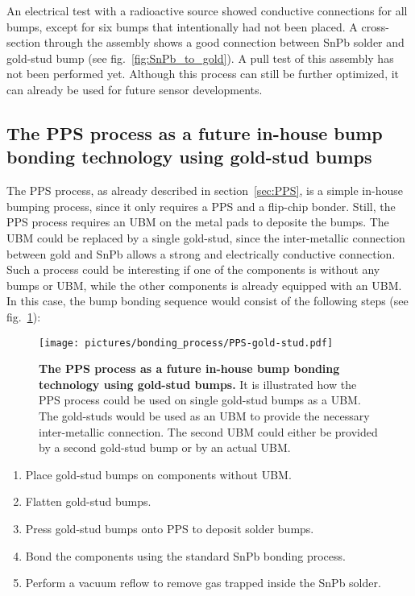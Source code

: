 An electrical test with a radioactive source showed conductive connections for all bumps, except for six bumps that intentionally had not been placed. A cross-section through the assembly shows a good connection between SnPb solder and gold-stud bump (see fig.~\ref{fig:SnPb_to_gold}). A pull test of this assembly has not been performed yet. Although this process can still be further optimized, it can already be used for future sensor developments.


\subsection{The \ac{PPS} process as a future in-house bump bonding technology using gold-stud bumps}
The \ac{PPS} process, as already described in section~\ref{sec:PPS}, is a simple in-house bumping process, since it only requires a \ac{PPS} and a flip-chip bonder. Still, the \ac{PPS} process requires an \ac{UBM} on the metal pads to deposite the bumps. The \ac{UBM} could be replaced by a single gold-stud, since the inter-metallic connection between gold and SnPb allows a strong and electrically conductive connection. Such a process could be interesting if one of the components is without any bumps or \ac{UBM}, while the other components is already equipped with an \ac{UBM}. In this case, the bump bonding sequence would consist of the following steps (see fig.~\ref{fig:PPS_gold-stud}):
\begin{figure}
\begin{center}
\texttt{[image: pictures/bonding\_process/PPS-gold-stud.pdf]}
\end{center}
\caption[The Pre-coated Powder Sheet (PPS) process as a future in-house bump bonding technology using gold-stud bumps]{\textbf{The \ac{PPS} process as a future in-house bump bonding technology using gold-stud bumps.} It is illustrated how the PPS process could be used on single gold-stud bumps as a \ac{UBM}. The gold-studs would be used as an \ac{UBM} to provide the necessary inter-metallic connection. The second \ac{UBM} could either be provided by a second gold-stud bump or by an actual \ac{UBM}.}\label{fig:PPS_gold-stud}
\end{figure}
\begin{enumerate}
\item Place gold-stud bumps on components without \ac{UBM}.
\item Flatten gold-stud bumps.
\item Press gold-stud bumps onto \ac{PPS} to deposit solder bumps.
\item Bond the components using the standard SnPb bonding process.
\item Perform a vacuum reflow to remove gas trapped inside the SnPb solder.
\end{enumerate}


